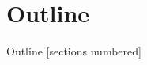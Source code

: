 \section*{Outline}
\begin{frame}{Outline}
[sections numbered]
\tableofcontents[hideallsubsections]
\end{frame}